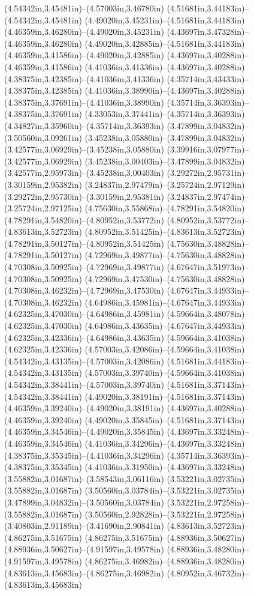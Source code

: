 (4.54342in,3.45481in)--(4.57003in,3.46780in) (4.51681in,3.44183in)--(4.54342in,3.45481in) (4.49020in,3.45231in)--(4.51681in,3.44183in) (4.46359in,3.46280in)--(4.49020in,3.45231in) (4.43697in,3.47328in)--(4.46359in,3.46280in) (4.49020in,3.42885in)--(4.51681in,3.44183in) (4.46359in,3.41586in)--(4.49020in,3.42885in) (4.43697in,3.40288in)--(4.46359in,3.41586in) (4.41036in,3.41336in)--(4.43697in,3.40288in) (4.38375in,3.42385in)--(4.41036in,3.41336in) (4.35714in,3.43433in)--(4.38375in,3.42385in) (4.41036in,3.38990in)--(4.43697in,3.40288in) (4.38375in,3.37691in)--(4.41036in,3.38990in) (4.35714in,3.36393in)--(4.38375in,3.37691in) (4.33053in,3.37441in)--(4.35714in,3.36393in) (4.34827in,3.35960in)--(4.35714in,3.36393in) (3.47899in,3.04832in)--(3.50560in,3.09261in) (3.45238in,3.05880in)--(3.47899in,3.04832in) (3.42577in,3.06929in)--(3.45238in,3.05880in) (3.39916in,3.07977in)--(3.42577in,3.06929in) (3.45238in,3.00403in)--(3.47899in,3.04832in) (3.42577in,2.95973in)--(3.45238in,3.00403in) (3.29272in,2.95731in)--(3.30159in,2.95382in) (3.24837in,2.97479in)--(3.25724in,2.97129in) (3.29272in,2.95730in)--(3.30159in,2.95381in) (3.24837in,2.97474in)--(3.25724in,2.97125in) (4.75630in,3.55868in)--(4.78291in,3.54820in) (4.78291in,3.54820in)--(4.80952in,3.53772in) (4.80952in,3.53772in)--(4.83613in,3.52723in) (4.80952in,3.51425in)--(4.83613in,3.52723in) (4.78291in,3.50127in)--(4.80952in,3.51425in) (4.75630in,3.48828in)--(4.78291in,3.50127in) (4.72969in,3.49877in)--(4.75630in,3.48828in) (4.70308in,3.50925in)--(4.72969in,3.49877in) (4.67647in,3.51973in)--(4.70308in,3.50925in) (4.72969in,3.47530in)--(4.75630in,3.48828in) (4.70308in,3.46232in)--(4.72969in,3.47530in) (4.67647in,3.44933in)--(4.70308in,3.46232in) (4.64986in,3.45981in)--(4.67647in,3.44933in) (4.62325in,3.47030in)--(4.64986in,3.45981in) (4.59664in,3.48078in)--(4.62325in,3.47030in) (4.64986in,3.43635in)--(4.67647in,3.44933in) (4.62325in,3.42336in)--(4.64986in,3.43635in) (4.59664in,3.41038in)--(4.62325in,3.42336in) (4.57003in,3.42086in)--(4.59664in,3.41038in) (4.54342in,3.43135in)--(4.57003in,3.42086in) (4.51681in,3.44183in)--(4.54342in,3.43135in) (4.57003in,3.39740in)--(4.59664in,3.41038in) (4.54342in,3.38441in)--(4.57003in,3.39740in) (4.51681in,3.37143in)--(4.54342in,3.38441in) (4.49020in,3.38191in)--(4.51681in,3.37143in) (4.46359in,3.39240in)--(4.49020in,3.38191in) (4.43697in,3.40288in)--(4.46359in,3.39240in) (4.49020in,3.35845in)--(4.51681in,3.37143in) (4.46359in,3.34546in)--(4.49020in,3.35845in) (4.43697in,3.33248in)--(4.46359in,3.34546in) (4.41036in,3.34296in)--(4.43697in,3.33248in) (4.38375in,3.35345in)--(4.41036in,3.34296in) (4.35714in,3.36393in)--(4.38375in,3.35345in) (4.41036in,3.31950in)--(4.43697in,3.33248in) (3.55882in,3.01687in)--(3.58543in,3.06116in) (3.53221in,3.02735in)--(3.55882in,3.01687in) (3.50560in,3.03784in)--(3.53221in,3.02735in) (3.47899in,3.04832in)--(3.50560in,3.03784in) (3.53221in,2.97258in)--(3.55882in,3.01687in) (3.50560in,2.92828in)--(3.53221in,2.97258in) (3.40803in,2.91189in)--(3.41690in,2.90841in) (4.83613in,3.52723in)--(4.86275in,3.51675in) (4.86275in,3.51675in)--(4.88936in,3.50627in) (4.88936in,3.50627in)--(4.91597in,3.49578in) (4.88936in,3.48280in)--(4.91597in,3.49578in) (4.86275in,3.46982in)--(4.88936in,3.48280in) (4.83613in,3.45683in)--(4.86275in,3.46982in) (4.80952in,3.46732in)--(4.83613in,3.45683in) 